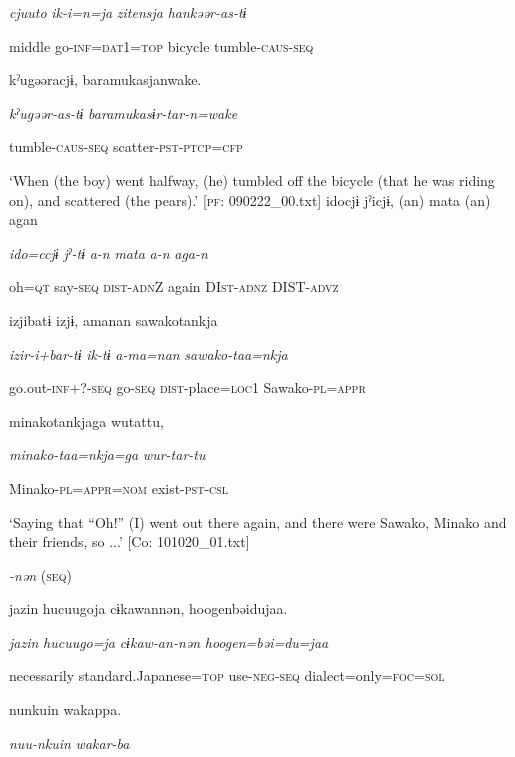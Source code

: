       \textit{cjuuto}  \textit{ik-i=n=ja}  \textit{zitensja}  \textit{hankəər-as-tɨ}

      middle  go-\textsc{inf}=\textsc{dat}1=\textsc{top}  bicycle  tumble-\textsc{caus}-\textsc{seq}

      kˀugəəracjɨ,  baramukasjanwake.

      \textit{kˀugəər-as-tɨ}  \textit{baramukasɨr-tar-n=wake}

      tumble-\textsc{caus}-\textsc{seq}  scatter-\textsc{pst}-\textsc{ptcp}=\textsc{cfp}

\glt ‘When (the boy) went halfway, (he) tumbled off the bicycle (that he was riding on), and scattered (the pears).’ [\textsc{pf}: 090222\_00.txt]
\ex {\TM}
\glll  idocjɨ  jˀicjɨ,  (an)  mata  (an)  agan

      \textit{ido=ccjɨ}  \textit{jˀ-tɨ}  \textit{a-n}  \textit{mata}  \textit{a-n}  \textit{aga-n}

      oh=\textsc{qt}  say-\textsc{seq}  \textsc{dist}-\textsc{adn}Z  again  DI\textsc{st}-\textsc{adnz}  DIST-\textsc{advz}

      izjibatɨ  izjɨ,  amanan  sawakotankja

      \textit{izir-i+bar-tɨ}  \textit{ik-tɨ}  \textit{a-ma=nan}  \textit{sawako-taa=nkja}

      go.out-\textsc{inf}+?-\textsc{seq}  go-\textsc{seq}  \textsc{dist}-place=\textsc{loc}1  Sawako-\textsc{pl}=\textsc{appr}

      minakotankjaga  wutattu,

      \textit{minako-taa=nkja=ga}  \textit{wur-tar-tu}

      Minako-\textsc{pl}=\textsc{appr}=\textsc{nom}  exist-\textsc{pst}-\textsc{csl}

\glt ‘Saying that “Oh!” (I) went out there again, and there were Sawako, Minako and their friends, so ...’ [Co: 101020\_01.txt]
\z

  \textit{{}-nən} (\textsc{seq})

\ex {\TM}
\glll  jazin  {\textbar}hucuugo{\textbar}ja  cɨkawannən,  {\textbar}hoogen{\textbar}bəidujaa.

      \textit{jazin}  \textit{hucuugo=ja}  \textit{cɨkaw-an-nən}  \textit{hoogen=bəi=du=jaa}

      necessarily  standard.Japanese=\textsc{top}  use-\textsc{neg}-\textsc{seq}  dialect=only=\textsc{foc}=\textsc{sol}

      nunkuin  wakappa.

      \textit{nuu-nkuin}  \textit{wakar-ba}


